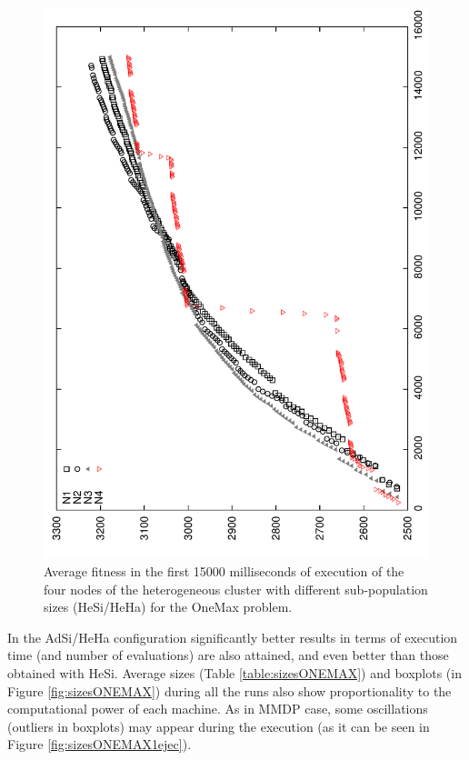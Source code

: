 \begin{figure}
\centering
\includegraphics[angle=-90,scale =0.4] {gfx/adaptiveresults/generationsONEMAXheterosize.pdf}
\caption{Average fitness in the first 15000 milliseconds of execution of the four nodes of the heterogeneous cluster with different sub-population sizes (HeSi/HeHa) for the OneMax problem.}
\label{fig:gensonemaxheterosize}
\end{figure}


In the AdSi/HeHa configuration significantly better results in terms of execution time (and number of evaluations) are also attained, and even better than those obtained with HeSi. Average sizes (Table \ref{table:sizesONEMAX}) and boxplots (in Figure \ref{fig:sizesONEMAX}) during all the runs also show proportionality to the computational power of each machine. As in MMDP case, some oscillations (outliers in boxplots) may appear during the execution (as it can be seen in Figure \ref{fig:sizesONEMAX1ejec}).

